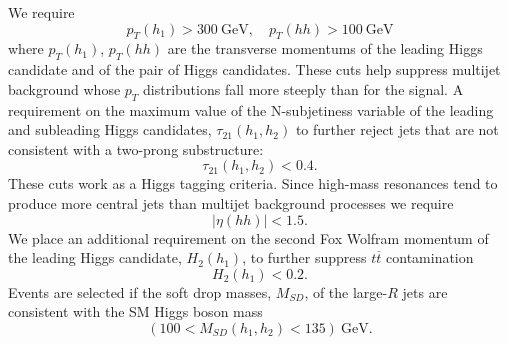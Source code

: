 We require
\begin{equation}
	p_T(h_1)>300~\text{GeV}, \quad p_T(hh)>100 ~\text{GeV}
\end{equation}
where $p_T(h_1)$, $p_T(hh)$ are the transverse momentums of the leading Higgs candidate and of the pair of Higgs candidates.
These cuts help suppress multijet background whose $p_T$ distributions fall more steeply than for the signal. A requirement on the maximum value of the N-subjetiness variable of the leading and subleading Higgs candidates, $\tau_{21}(h_1,h_2)$ to further reject jets that are not consistent with a two-prong substructure:
\begin{equation}
	\tau_{21}(h_1,h_2)<0.4.
\end{equation}
These cuts work as a Higgs tagging criteria.
Since high-mass resonances tend to produce more central jets than multijet background processes we require
\begin{equation}
	|\eta(hh)|<1.5.
\end{equation}
We place an additional requirement on the second Fox Wolfram momentum of the leading Higgs candidate, $H_2(h_1)$, to further suppress $t\overline{t}$ contamination
\begin{equation}
	H_2(h_1)<0.2.
\end{equation}
Events are selected if the soft drop masses, $M_{SD}$, of the large-$R$ jets are consistent with the SM Higgs boson mass
\begin{equation}
	(100<M_{SD}(h_1,h_2)<135) ~\text{GeV}.
\end{equation}

